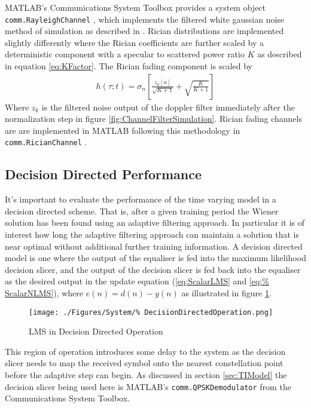 MATLAB's Communications System Toolbox provides a system object %
\texttt{comm.RayleighChannel} \cite{RayleighChannel}, %
which implements the filtered %
white gaussian noise method of simulation as described in 
\cite{Iskander}. Rician distributions are implemented slightly %
differently where the Rician coefficients are further scaled by a %
deterministic component with a specular to %
scattered power ratio $K$ as described in equation %
\ref{eq:KFactor}. The Rician fading component is scaled by %
\begin{align}
	h(\tau;t) = \sigma_n\left[ \frac{z_{k}\left[n\right]}
	{\sqrt{K + 1}} + 
	\sqrt{\frac{K}{K+1}}\right]
\end{align}
Where $z_{k}$ is the filtered noise output of the doppler filter 
\cite{Iskander} immediately after the normalization step in figure %
\ref{fig:ChannelFilterSimulation}. Rician fading channels are %
are implemented in MATLAB following this methodology in %
\texttt{comm.RicianChannel} \cite{RicianChannel}.

\subsection{Decision Directed Performance}

It's important to evaluate the performance of the time varying model %
in a decision directed scheme. That is, after a given %
training period the Wiener solution has been found using an adaptive %
filtering approach. In particular it is of interest how long the %
adaptive filtering approach can maintain a solution that is near %
optimal without additional further training %
information. A decision directed model is one where the %
output of the equaliser is fed into the maximum likelihood %
decision slicer, and the output of the decision slicer is fed back %
into the equaliser as the desired %
output in the update equation (\ref{eq:ScalarLMS} and \ref{eq:%
ScalarNLMS}), where $e(n) = d(n) - y(n)$ as illustrated in figure %
\ref{fig:DDLMS}.
\begin{figure}[ht]
	\texttt{[image: ./Figures/System/\%
	DecisionDirectedOperation.png]}
	\caption{LMS in Decision Directed Operation}
	\label{fig:DDLMS}
\end{figure}
This region of operation introduces some delay to the system as %
the decision slicer needs to map the received symbol onto the %
nearest constellation point before the adaptive step can begin. %
As discussed in section \ref{sec:TIModel} the decision slicer %
being used here is MATLAB's \texttt{comm.QPSKDemodulator} %
from the Communications System Toolbox.

